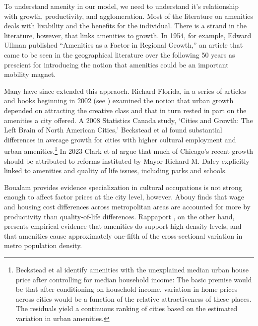To understand amenity in our model, we need to understand it's relationship with growth, productivity, and agglomeration. Most of the literature on amenities deals with livability and the benefits for the individual. There is a strand in the literature, however, that links amenities to  growth. In 1954, for example, Edward Ullman \cite{ullmanAmenitiesFactorRegional1954} published  ``Amenities as a Factor in Regional Growth,'' an article that came to be seen in the geographical literature over the following 50 years as prescient \cite{walcottCommentsEdwardUllman2010} for introducing  the notion that amenities could be an important mobility magnet. 

Many have since extended this appraoch. Richard Florida, in a series of articles and books beginning in 2002 (see \cite{floridaCreativeClassEconomic2014}) examined the notion that urban growth depended on attracting  the creative class and that in turn rested in part on the amenities a city offered. A 2008  Statistics Canada study, `Cities and Growth: The Left Brain of North American Cities,' Beckstead et al  \cite{becksteadCitiesGrowthLeft2008} found substantial differences in average growth for cities with higher cultural employment and urban amenities.\footnote{Beckstead et al identify amenities with the unexplained median urban house price after controlling for median household income:  The basic premise would be that after conditioning on household income, variation in home prices across cities would be a function of the relative attractiveness of these places. The residuals  yield a continuous ranking of cities based on the estimated variation in urban amenities.} 
In 2023 Clark et al \cite{clarkAmenitiesDriveUrban2002} argue that much of Chicago's recent growth  should be attributed to reforms instituted by Mayor Richard M.  Daley  explicitly linked to amenities and quality of life issues, including parks and schools.

Boualam \cite{boualamDoesCultureAffect2014} provides evidence specialization in cultural occupations is not strong enough to affect factor prices at the city level, however. Abouy \cite{albouyWhatAreCities2016} finds that wage and housing cost differences across metropolitan areas are accounted for more by productivity than quality-of-life differences. Rappaport \cite{rappaportConsumptionAmenitiesCity2008}, on the other hand, presents empirical evidence  that amenities do support high-density levels, and that amenities  cause approximately one-fifth of the cross-sectional variation in metro population density. 

